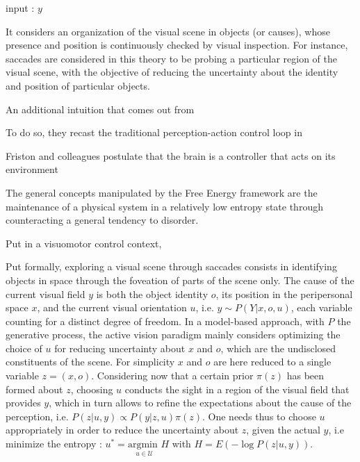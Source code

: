 \documentclass[12pt,twoside,openright]{article}
\begin{document}
	input : $y$
	
	It considers an organization of the visual scene in objects (or causes), whose presence and position is continuously checked by visual inspection. For instance, saccades are considered in this theory to be probing a particular region of the visual scene, with the objective of reducing the uncertainty about the identity and position of particular objects. %
	
	{\color{blue}
		
		
		An additional intuition that comes out from
		
		To do so, they recast the traditional perception-action control loop in  		 
	
		
		
		Friston and colleagues postulate that the brain is a controller that acts on its environment 
		
		The general concepts manipulated by the Free Energy framework are the maintenance of a physical system in a relatively low entropy state through counteracting a general tendency to disorder. 
		
		Put in a visuomotor control context, 
		
	}
	
	Put formally, exploring a visual scene through saccades consists in identifying objects in space through the foveation of parts of the scene only. The cause of the current visual field $y$ is both the object identity $o$, its position in the peripersonal space $x$, and the current visual orientation $u$, i.e. $y \sim P(Y|x,o,u)$, each variable counting for a distinct degree of freedom. %
	In a model-based approach, with $P$ the generative process, the active vision paradigm mainly considers optimizing the choice of $u$ for reducing uncertainty about $x$ and $o$, which are the undisclosed constituents of the scene. For simplicity $x$ and $o$ are here reduced to a single variable $z = (x, o)$. Considering now that a certain prior $\pi(z)$ has been formed about $z$, choosing  $u$ conducts the sight in a region of the visual field that provides $y$, which in turn allows to refine the expectations about the cause of the perception, i.e.
	$ P(z|u,y) \propto P(y|z,u) \pi(z)$. 
	One needs thus to choose $u$ appropriately in order to reduce the uncertainty about $z$, given the actual $y$, i.e minimize the entropy :
	$u^* = \underset{u \in \mathcal{U}}{\text{argmin }} H$ with $H = E(-\log P(z|u,y))$.
	
\end{document}
